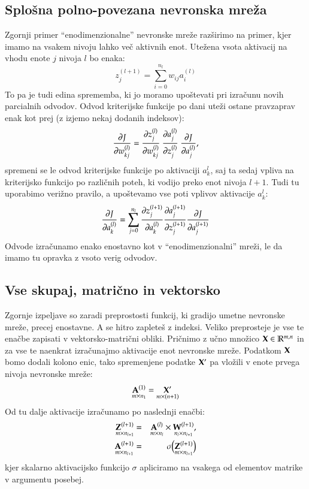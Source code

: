 \subsection{Splošna polno-povezana nevronska mreža}

Zgornji primer ``enodimenzionalne'' nevronske mreže razširimo na primer, kjer imamo na vsakem nivoju lahko več aktivnih enot. Utežena vsota aktivacij na vhodu enote $j$ nivoja $l$ bo enaka:
\begin{equation}
  z^{(l+1)}_j = \sum_{i=0}^{n_{l}} w_{ij} a_{i}^{(l)}
\end{equation}
\noindent To pa je tudi edina sprememba, ki jo moramo upoštevati pri izračunu novih parcialnih odvodov. Odvod kriterijske funkcije po dani uteži ostane pravzaprav enak kot prej (z izjemo nekaj dodanih indeksov):
\begin{equation}
  \pd{J}{w_{kj}^{(l)}} = \pd{z_j^{(l)}}{w_{kj}^{(l)}}\ \pd{a_j^{(l)}}{z_j^{(l)}}\ \pd{J}{a_j^{(l)}},
\end{equation}
\noindent spremeni se le odvod kriterijske funkcije po aktivaciji $a_k^l$, saj ta sedaj vpliva na kriterijsko funkcijo po različnih poteh, ki vodijo preko enot nivoja $l+1$. Tudi tu uporabimo verižno pravilo, a upoštevamo vse poti vplivov aktivacije $a_k^l$:
\begin{equation}
  \frac{\partial J}{\partial a_k^{(l)}} = \sum_{j=0}^{n_l} \frac{\partial z_j^{(l+1)}}{\partial a_k^{(l)}} \frac{\partial a_j^{(l+1)}}{\partial z_j^{(l+1)}} \frac{\partial J}{\partial a_j^{(l+1)}}
\end{equation}
\noindent Odvode izračunamo enako enostavno kot v ``enodimenzionalni'' mreži, le da imamo tu opravka z vsoto verig odvodov.

\subsection{Vse skupaj, matrično in vektorsko}

Zgornje izpeljave so zaradi preprostosti funkcij, ki gradijo umetne nevronske mreže, precej enostavne. A se hitro zapleteš z indeksi. Veliko preprosteje je vse te enačbe zapisati v vektorsko-matrični obliki. Pričnimo z učno množico $\mathbf{X}\in\mathbb{R}^{m,n}$ in za vse te naenkrat izračunajmo aktivacije enot nevronske mreže. Podatkom $\mathbf{X}$bomo dodali kolono enic, tako spremenjene podatke $\mathbf{X}'$ pa vložili v enote prvega nivoja nevronske mreže:
\begin{equation}
  \underset{m \times n_1}{\mathbf{A}^{(1)}} = \underset{m\times(n+1)}{\mathbf{X}'}
\end{equation}
\noindent Od tu dalje aktivacije izračunamo po naslednji enačbi:
\begin{eqnarray}
  \underset{m\times n_{l+1}}{\mathbf{Z}^{(l+1)}} & = & \underset{m\times n_l}{\mathbf{A}^{(l)}} \times \underset{n_l\times n_{l+1}}{\mathbf{W}^{(l+1)}}, \\
  \underset{m\times n_{l+1}}{\mathbf{A}^{(l+1)}} & = & \sigma\big(\underset{m\times n_{l+1}}{\mathbf{Z}^{(l+1)}}\big)
\end{eqnarray}
\noindent kjer skalarno aktivacijsko funkcijo $\sigma$ apliciramo na vsakega od elementov matrike v argumentu posebej.


